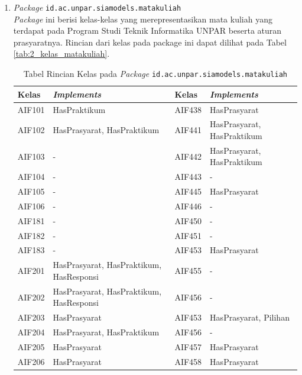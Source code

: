 \begin{enumerate}
	\item \textit{Package} \texttt{id.ac.unpar.siamodels.matakuliah}\\
	\textit{Package} ini berisi kelas-kelas yang merepresentasikan mata kuliah yang terdapat pada Program Studi Teknik Informatika UNPAR beserta aturan prasyaratnya. Rincian dari kelas pada package ini dapat dilihat pada Tabel \ref{tab:2_kelas_matakuliah}.
	
\begin{table}[H]
	\centering
	\caption{Tabel Rincian Kelas pada \textit{Package} \texttt{id.ac.unpar.siamodels.matakuliah}}
    \begin{tabular}{|p{2.125cm}|p{4.9cm}|p{2.125cm}|p{4.9cm}|}
		\hline
		Kelas & \textit{Implements} & Kelas & \textit{Implements}\\
		\hline
    AIF101  & HasPraktikum               &    AIF438  & HasPrasyarat \\
    AIF102  & HasPrasyarat, HasPraktikum &    AIF441  & HasPrasyarat, HasPraktikum \\
    AIF103  & -                          &    AIF442  & HasPrasyarat, HasPraktikum \\
    AIF104  & -                          &    AIF443  & -            \\
    AIF105  & -                          &    AIF445  & HasPrasyarat \\
    AIF106  & -                          &    AIF446  & -            \\
    AIF181  & -                          &    AIF450  & -                          \\
    AIF182  & -                          &    AIF451  & -            \\
    AIF183  & -                          &    AIF453  & HasPrasyarat    \\
    AIF201  & HasPrasyarat, HasPraktikum, HasResponsi &    AIF455  & -                          \\
    AIF202  & HasPrasyarat, HasPraktikum, HasResponsi &    AIF456  & -               \\
    AIF203  & HasPrasyarat               &    AIF453  & HasPrasyarat, Pilihan      \\
    AIF204  & HasPrasyarat, HasPraktikum &    AIF456  & -                          \\
    AIF205  & HasPrasyarat   &    AIF457  & HasPrasyarat			 \\
    AIF206  & HasPrasyarat   &    AIF458  & HasPrasyarat               \\

\end{tabular}
\end{table}
\end{enumerate}
